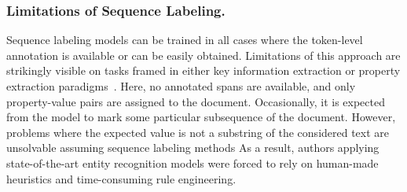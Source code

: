 \documentclass[runningheads]{llncs}
\begin{document}
\subsubsection{Limitations of Sequence Labeling.}
Sequence labeling models can be trained in all cases where the token-level annotation is available or can be easily obtained. Limitations of this approach are strikingly visible on tasks framed in either key information extraction or property extraction paradigms~\cite{Huang2019ICDAR2019CO,dwojak-etal-2020-dataset}. Here, no annotated spans are available, and only property-value pairs are assigned to the document. Occasionally, it is expected from the model to mark some particular subsequence of the document. However, problems where the expected value is not a substring of the considered text are unsolvable assuming sequence labeling methods As a result, authors applying state-of-the-art entity recognition models were forced to rely on human-made heuristics and time-consuming rule engineering.


\end{document}
